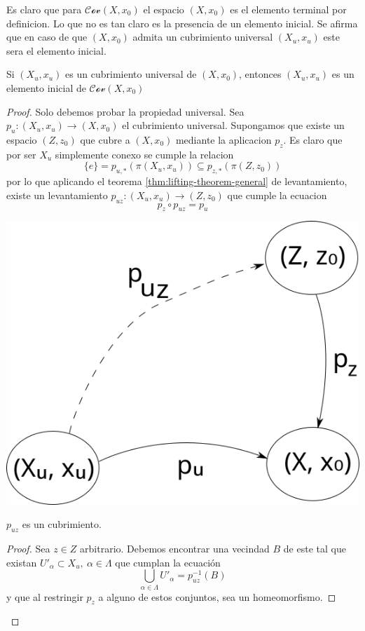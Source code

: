 Es claro que para \(\mathscr{Cov}(X, x_0)\) el espacio \((X, x_0)\) es
el elemento terminal por definicion. Lo que no es tan claro es la
presencia de un elemento inicial. Se afirma que en caso de que \((X,
x_0)\) admita un cubrimiento universal \((X_u, x_u)\) este sera el
elemento inicial.

\begin{teorema} \label{thm:universal-initial}
  Si \((X_u, x_u)\) es un cubrimiento universal de \((X, x_0)\),
  entonces \((X_u, x_u)\) es un elemento inicial de \(\mathscr{Cov} (X,
  x_0)\)
\end{teorema}
\begin{proof}
  Solo debemos probar la propiedad universal. Sea \(p_u : (X_u, x_u) \to
  (X, x_0)\) el cubrimiento universal. Supongamos que existe un espacio
  \((Z, z_0)\) que cubre a \((X, x_0)\) mediante la aplicacion
  \(p_{z}\). Es claro que por ser \(X_u\) simplemente conexo se
  cumple la relacion
  \[ \{e\} = p_{u,*} \left( \pi (X_u, x_u) \right) \subseteq p_{z,*}
    \left( \pi (Z, z_0) \right)\]
  por lo que aplicando el teorema \ref{thm:lifting-theorem-general} de
  levantamiento, existe un levantamiento \(p_{uz} : (X_u, x_u) \to (Z,
  z_0)\) que cumple la ecuacion
  \[ p_{z} \circ p_{uz} = p_u \]
  \begin{center}
    \includegraphics[scale=0.25]{./imagenes/lifting-path-cat-covering.png}
  \end{center}

  \begin{lema}
    \(p_{uz}\) es un cubrimiento.
  \end{lema}
  \begin{proof}
  Sea \(z \in Z\) arbitrario. Debemos encontrar una vecindad \(B\) de este
  tal que existan \(U'_\alpha \subset X_u,\ \alpha \in \Lambda \) que
  cumplan la ecuación
  \[ \bigcup_{\alpha \in \Lambda} U'_\alpha = p_{uz}^{-1} (B) \]
  y que al restringir \(p_z\) a alguno de estos conjuntos, sea un
  homeomorfismo.


\end{proof}
\end{proof}
